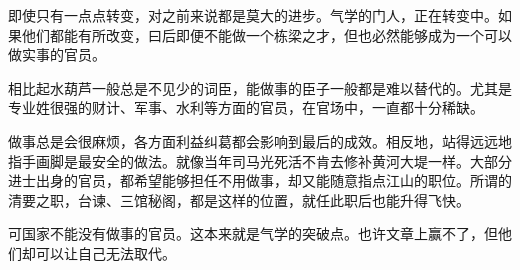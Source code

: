 即使只有一点点转变，对之前来说都是莫大的进步。气学的门人，正在转变中。如果他们都能有所改变，曰后即便不能做一个栋梁之才，但也必然能够成为一个可以做实事的官员。

相比起水葫芦一般总是不见少的词臣，能做事的臣子一般都是难以替代的。尤其是专业姓很强的财计、军事、水利等方面的官员，在官场中，一直都十分稀缺。

做事总是会很麻烦，各方面利益纠葛都会影响到最后的成效。相反地，站得远远地指手画脚是最安全的做法。就像当年司马光死活不肯去修补黄河大堤一样。大部分进士出身的官员，都希望能够担任不用做事，却又能随意指点江山的职位。所谓的清要之职，台谏、三馆秘阁，都是这样的位置，就任此职后也能升得飞快。

可国家不能没有做事的官员。这本来就是气学的突破点。也许文章上赢不了，但他们却可以让自己无法取代。

